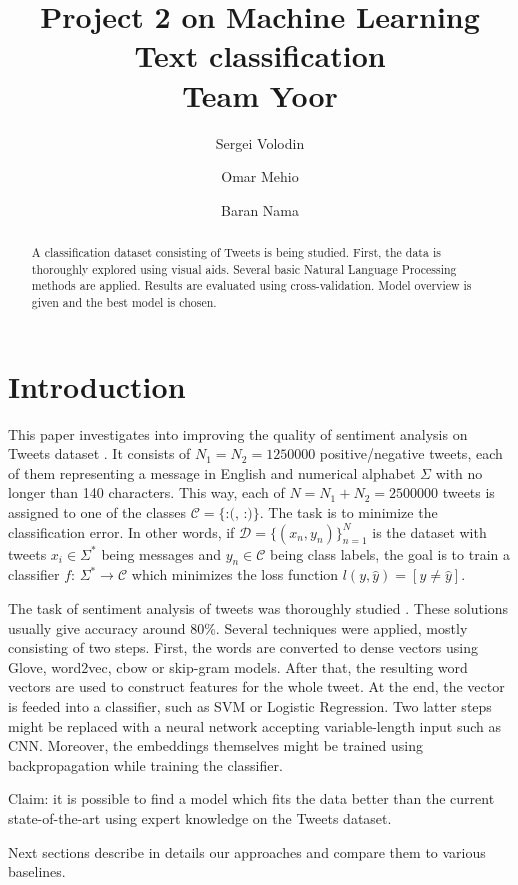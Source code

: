 \documentclass[10pt,conference,compsocconf]{IEEEtran}
\title{Project 2 on Machine Learning\\Text classification\\Team Yoor}
\author[1]{Sergei Volodin}
\author[1]{Omar Mehio}
\author[1]{Baran Nama}
\affil[1]{EPFL}
\affil[ ]{\textit {\{sergei.volodin,omar.mehio,baran.nama\}@epfl.ch}}
\begin{document}
\maketitle

\begin{abstract}
A classification dataset consisting of Tweets is being studied. First, the data is thoroughly explored using visual aids. Several basic Natural Language Processing methods are applied. Results are evaluated using cross-validation. Model overview is given and the best model is chosen.
\end{abstract}

\section{Introduction}
This paper investigates into improving the quality of sentiment analysis on Tweets dataset \cite{kaggle}.
It consists of $N_1=N_2=1250000$ positive/negative tweets, each of them representing a message in English and numerical alphabet $\Sigma$ with no longer than 140 characters.
This way, each of $N=N_1+N_2=2500000$ tweets is assigned to one of the classes $\mathcal{C}=\{\mbox{:(},\,\mbox{:)}\}$.
The task is to minimize the classification error.
In other words, if $\mathcal{D}=\{(x_n, y_n)\}_{n=1}^N$ is the dataset with tweets $x_i\in\Sigma^*$ being messages and $y_n\in \mathcal{C}$ being class labels, the goal is to train a classifier $f\colon\, \Sigma^*\to\mathcal{C}$ which minimizes the loss function $l(y,\hat{y})=[y\neq \hat{y}]$.

The task of sentiment analysis of tweets was thoroughly studied \cite{sota1, sota2, sota3, sota4}. These solutions usually give accuracy around 80\%.
Several techniques were applied, mostly consisting of two steps.
First, the words are converted to dense vectors using Glove, word2vec, cbow or skip-gram models.
After that, the resulting word vectors are used to construct features for the whole tweet.
At the end, the vector is feeded into a classifier, such as SVM or Logistic Regression.
Two latter steps might be replaced with a neural network accepting variable-length input such as CNN.
Moreover, the embeddings themselves might be trained using backpropagation while training the classifier.

Claim: it is possible to find a model which fits the data better than the current state-of-the-art using expert knowledge on the Tweets dataset.

Next sections describe in details our approaches and compare them to various baselines.
\end{document}
